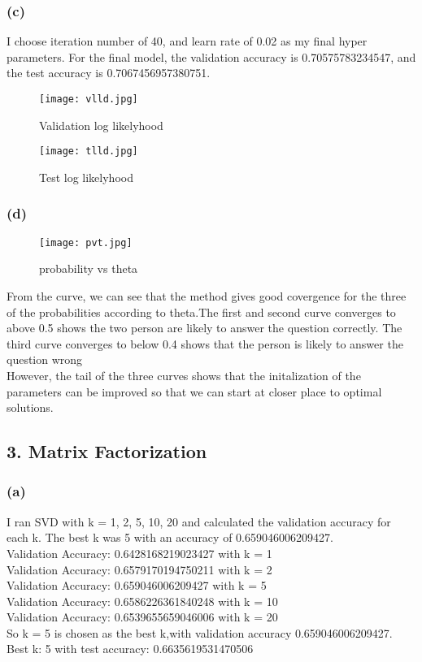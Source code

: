 \documentclass[12pt]{article}
\begin{document}
\subsubsection*{(c)}
I choose iteration number of 40, and learn rate of 0.02 as my final hyper parameters. For the final model, the validation accuracy is 0.70575783234547, and the test accuracy is 0.7067456957380751.\\
\begin{figure}[h]
    \begin{minipage}{0.4\textwidth}
    \centering
    \texttt{[image: vlld.jpg]}
    \caption{Validation log likelyhood}
    \label{fig:vlld}
    \end{minipage}%
    \begin{minipage}{0.4\textwidth}
    \centering
    \texttt{[image: tlld.jpg]}
    \caption{Test log likelyhood}
    \label{fig:tlld}
    \end{minipage}%
\end{figure}

\newpage
\subsubsection*{(d)}
\begin{figure}[h]
\centering
\texttt{[image: pvt.jpg]}
\caption{probability vs theta}
\end{figure}
\noindent From the curve, we can see that the method gives good covergence for the three of the probabilities according to theta.The first and second curve converges to above 0.5 shows the two person are likely to answer the question correctly. The third curve converges to below 0.4 shows that the person is likely to answer the question wrong\\
However, the tail of the three curves shows that the initalization of the parameters can be improved so that we can start at closer place to optimal solutions.
\newpage
\subsection*{3. Matrix Factorization}
\subsubsection*{(a)}
I ran SVD with k = 1, 2, 5, 10, 20 and calculated the validation accuracy for each k. The best k was 5 with an accuracy of 0.659046006209427.\\
Validation Accuracy: 0.6428168219023427 with k = 1\\
Validation Accuracy: 0.6579170194750211 with k = 2\\
Validation Accuracy: 0.659046006209427 with k = 5\\
Validation Accuracy: 0.6586226361840248 with k = 10\\
Validation Accuracy: 0.6539655659046006 with k = 20\\
So k = 5 is chosen as the best k,with validation accuracy 0.659046006209427.\\
Best k: 5 with test accuracy: 0.6635619531470506\\
\end{document}
